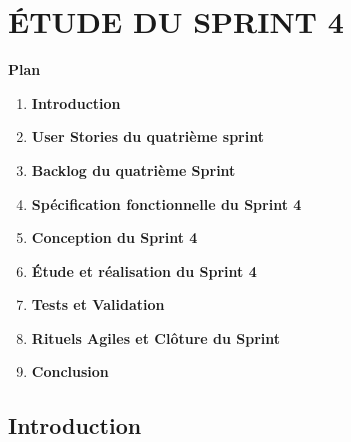 \newpage
\chapter{ÉTUDE DU SPRINT 4}


\vspace{2.5cm}

\noindent \textbf{\Large Plan}
\vspace{0.8cm}

\begin{enumerate}[label=\textbf{\arabic*}, leftmargin=1.5cm, labelsep=0.8cm]
    \item[] \hspace*{-1.5cm}\textbf{Introduction}                              \dotfill \pageref{sec:s4-intro}
    \item \textbf{User Stories du quatrième sprint}          \dotfill \pageref{sec:s4-userstories}
    \item \textbf{Backlog du quatrième Sprint}               \dotfill \pageref{sec:s4-backlog}
    \item \textbf{Spécification fonctionnelle du Sprint 4}   \dotfill \pageref{sec:s4-specification}
    \item \textbf{Conception du Sprint 4}                    \dotfill \pageref{sec:s4-conception}
    \item \textbf{Étude et réalisation du Sprint 4}          \dotfill \pageref{sec:s4-realisation}
    \item \textbf{Tests et Validation}                       \dotfill \pageref{sec:s4-tests}
    \item \textbf{Rituels Agiles et Clôture du Sprint}       \dotfill \pageref{sec:s4-rituels}
    \item[] \hspace*{-1.5cm} \textbf{Conclusion}                                \dotfill \pageref{sec:s4-conclusion}
\end{enumerate}

\vfill
\newpage

\section*{Introduction}
\label{sec:s4-intro}

